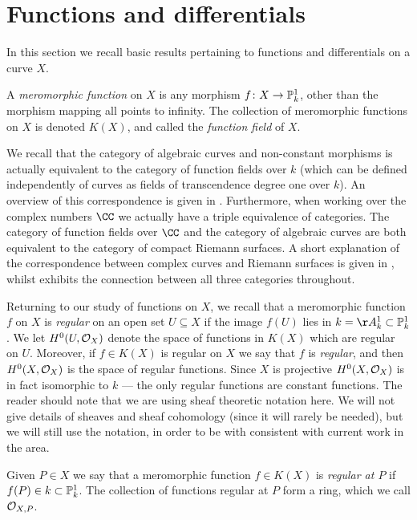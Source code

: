 \section{Functions and differentials}

In this section we recall basic results pertaining to functions and differentials on a curve $X$. 

A \emph{meromorphic function} on $X$ is any morphism $f \colon X \rightarrow {\mathbb P}_k^1$, other than the morphism mapping all points to infinity.
The collection of meromorphic functions on $X$ is denoted $K(X)$, and called the \emph{function field} of $X$.

We recall that the category of algebraic curves and non-constant morphisms is actually equivalent to the category of function fields over $k$ (which can be defined independently of curves as fields of transcendence degree one over $k$).
An overview of this correspondence is given in \cite[Appendix B]{stichtenoth}.
Furthermore, when working over the complex numbers $\CC$ we actually have a triple equivalence of categories.
The category of function fields over $\CC$ and the category of algebraic curves are both equivalent to the category of compact Riemann surfaces. 
A short explanation of the correspondence between complex curves and Riemann surfaces is given in \cite[Chap.\ 1, \S 2]{griffiths}, whilst \cite{miranda} exhibits the connection between all three categories throughout.


Returning to our study of functions on $X$, we recall that a meromorphic function $f$ on $X$ is \emph{regular} on an open set $U \subseteq X$ if the image $f(U)$ lies in $k = \AA_k^1 \subset \PP_k^1$.
We let $H^0(U,{\cal O}_X)$ denote the space of functions in $K(X)$ which are regular on $U$.
Moreover, if $f \in K(X)$ is regular on $X$ we say that $f$ is \emph{regular}, and then $H^0(X,{\cal O}_X)$ is the space of regular functions.
Since $X$ is projective $H^0(X,{\cal O}_X)$ is in fact isomorphic to $k$ --- \ie the only regular functions are constant functions.
The reader should note that we are using sheaf theoretic notation here. 
We will not give details of sheaves and sheaf cohomology (since it will rarely be needed), but we will still use the notation, in order to be with consistent with current work in the area.

Given $P \in X$ we say that a meromorphic function $f \in K(X)$ is \emph{regular at $P$} if $f(P) \in k \subset {\mathbb P}_k^1$.
The collection of functions regular at $P$ form a ring, which we call ${\cal O}_{X,P}$.

